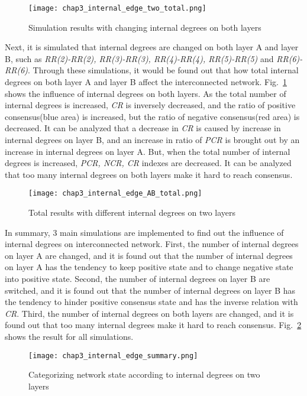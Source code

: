 \begin{figure}[!htb]
	\centering
	\texttt{[image: chap3\_internal\_edge\_two\_total.png]}
	\caption{Simulation results with changing internal degrees on both layers}
	\label{chap3_internal_edge_two_total}
\end{figure}
Next, it is simulated that internal degrees are changed on both layer A and layer B, such as \textit{RR(2)-RR(2), RR(3)-RR(3), RR(4)-RR(4), RR(5)-RR(5)} and \textit{RR(6)-RR(6)}. Through these simulations, it would be found out that how total internal degrees on both layer A and layer B affect the interconnected network.
Fig.~\ref{chap3_internal_edge_two_total} shows the influence of internal degrees on both layers. As the total number of internal degrees is increased, \textit{CR} is inversely decreased, and the ratio of positive consensus(blue area) is increased, but the ratio of negative consensus(red area) is decreased. It can be analyzed that a decrease in \textit{CR} is caused by increase in internal degrees on layer B, and an increase in ratio of \textit{PCR} is brought out by an increase in internal degrees on layer A. But, when the total number of internal degrees is increased, \textit{PCR, NCR, CR} indexes are decreased. It can be analyzed that too many internal degrees on both layers make it hard to reach consensus. 
\begin{figure}[!htb]
	\centering
	\texttt{[image: chap3\_internal\_edge\_AB\_total.png]}
	\caption{Total results with different internal degrees on two layers}
	\label{chap3_internal_edge_AB_total}
\end{figure}
In summary, 3 main simulations are implemented to find out the influence of internal degrees on interconnected network. First, the number of internal degrees on layer A are changed, and it is found out that the number of internal degrees on layer A has the tendency to keep positive state and to change negative state into positive state. Second, the number of internal degrees on layer B are switched, and it is found out that the number of internal degrees on layer B has the tendency to hinder positive consensus state and has the inverse relation with \textit{CR}. Third, the number of internal degrees on both layers are changed, and it is found out that too many internal degrees make it hard to reach consensus. Fig.~\ref{chap3_internal_edge_AB_total} shows the result for all simulations. 
\begin{figure}[!htb]
	\centering
	\texttt{[image: chap3\_internal\_edge\_summary.png]}
	\caption{Categorizing network state according to internal degrees on two layers}
	\label{chap3_internal_edge_summary}
\end{figure}
